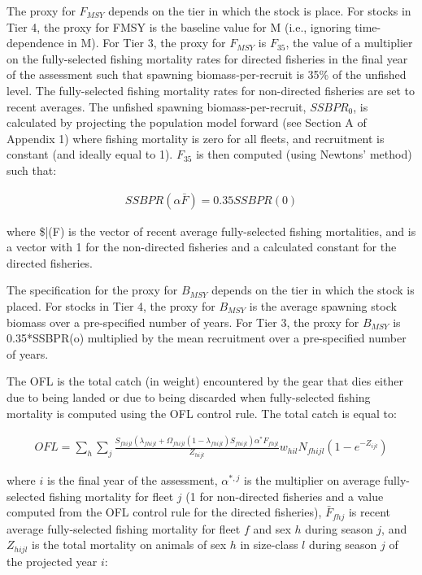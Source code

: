 \documentclass[]{article}
\begin{document}
The proxy for \(F_{MSY}\) depends on the tier in which the stock is
place. For stocks in Tier 4, the proxy for FMSY is the baseline value
for M (i.e., ignoring time-dependence in M). For Tier 3, the proxy for
\(F_{MSY}\) is \(F_{35}\), the value of a multiplier on the
fully-selected fishing mortality rates for directed fisheries in the
final year of the assessment such that spawning biomass-per-recruit is
35\% of the unfished level. The fully-selected fishing mortality rates
for non-directed fisheries are set to recent averages. The unfished
spawning biomass-per-recruit, \(SSBPR_{0}\), is calculated by projecting
the population model forward (see Section A of Appendix 1) where fishing
mortality is zero for all fleets, and recruitment is constant (and
ideally equal to 1). \(F_{35}\) is then computed (using Newtons' method)
such that:

\begin{align}
 SSBPR(\alpha\bar{F}) = 0.35 SSBPR(0)
 \end{align}

where \$\bar(F) is the vector of recent average fully-selected fishing
mortalities, and \alpha is a vector with 1 for the non-directed
fisheries and a calculated constant for the directed fisheries.

The specification for the proxy for \(B_{MSY}\) depends on the tier in
which the stock is placed. For stocks in Tier 4, the proxy for
\(B_{MSY}\) is the average spawning stock biomass over a pre-specified
number of years. For Tier 3, the proxy for \(B_{MSY}\) is 0.35*SSBPR(o)
multiplied by the mean recruitment over a pre-specified number of years.

The OFL is the total catch (in weight) encountered by the gear that dies
either due to being landed or due to being discarded when fully-selected
fishing mortality is computed using the OFL control rule. The total
catch is equal to:

\begin{align}
 OFL = \sum_{h} \sum_{j}  
        \frac{S_{fhijl}(\lambda_{fhijl} + \Omega_{fhijl}(1-\lambda_{fhijl})S_{fhijl})\alpha^{*}F_{fhjl}}
        {Z_{hijl}} w_{hil} N_{fhijl}(1-e^{-Z_{ijl}})

\end{align}

where \(i\) is the final year of the assessment, \(\alpha^{*,j}\) is the
multiplier on average fully-selected fishing mortality for fleet \(j\)
(1 for non-directed fisheries and a value computed from the OFL control
rule for the directed fisheries), \(\bar{F}_{fhj}\) is recent average
fully-selected fishing mortality for fleet \(f\) and sex \(h\) during
season \(j\), and \(Z_{hijl}\) is the total mortality on animals of sex
\(h\) in size-class \(l\) during season \(j\) of the projected year
\(i\):
\end{document}
